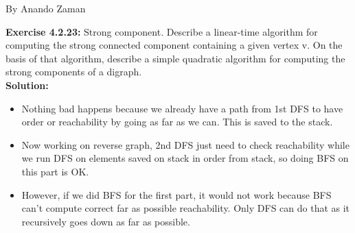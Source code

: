 \documentclass[11pt,fleqn]{article}
\begin{document}
By Anando Zaman

\textbf{Exercise 4.2.23:} Strong component. Describe a linear-time algorithm for computing the strong
connected component containing a given vertex v. On the basis of that algorithm, describe
a simple quadratic algorithm for computing the strong components of a digraph.\\

\textbf{Solution:}\\
\begin{itemize}
	\item Nothing bad happens because we already have a path from 1st DFS to have order or reachability by going as far as we can. This is saved to the stack.

	\item Now working on reverse graph, 2nd DFS just need to check reachability while we run DFS on elements saved on stack in order from stack, so doing BFS on this part is OK.
	
	\item However, if we did BFS for the first part, it would not work because BFS can't compute correct far as possible reachability. Only DFS can do that as it recursively goes down as far as possible.
\end{itemize}


	
\end{document}
